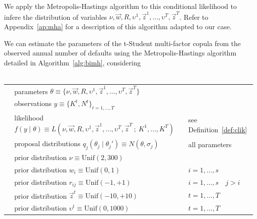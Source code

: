 \documentclass[11pt,fleqn]{book} %
\begin{document}
We apply the Metropolis-Hastings algorithm to this conditional likelihood  
to infere the distribution of variables $\nu,\vec{w},R, \upsilon^1,\vec{z}^1,
\dots,\upsilon^T,\vec{z}^T$. Refer to Appendix~\ref{ap:mha} for a description 
of this algorithm adapted to our case.

\begin{proposition}
	\label{prop:pemh}
	We can estimate the parameters of the t-Student multi-factor copula from 
	the observed annual number of defaults using the Metropolis-Hastings 
	algorithm detailed in Algorithm~\ref{alg:bimh}, considering
	~\\
	~\\
	\begin{listliketab} 
		\begin{tabular}{lll}
			\textbullet & parameters $\theta \equiv \{ \nu,\vec{w},R,\upsilon^1,\vec{z}^1,\dots,\upsilon^T,\vec{z}^T\}$ & \\
			\textbullet & observations $y \equiv \{K^t, N^t\}_{t=1,\dots,T}$ & \\
			\textbullet & likelihood $f(y \mid \theta) \equiv L(\nu,\vec{w},R,\upsilon^1,\vec{z}^1,\dots,\upsilon^T,\vec{z}^T\ ;\ K^1,\dots,K^T)$ & see Definition~\ref{def:clik} \\
			\textbullet & proposal distributions $q_j(\theta_j \mid \theta_j') \equiv N(\theta,\sigma_j)$ & all parameters\\
			\textbullet & prior distribution $\nu \equiv \text{Unif}(2,300)$ & \\
			\textbullet & prior distribution $w_i \equiv \text{Unif}(0,1)$ & $i=1,\dots,s$ \\
			\textbullet & prior distribution $r_{ij} \equiv \text{Unif}(-1,+1)$ & $i=1,\dots,s \quad j>i$ \\
			\textbullet & prior distribution $\vec{z}^t \equiv \text{Unif}(-10,+10)$ & $t=1,\dots,T$ \\
			\textbullet & prior distribution $\upsilon^t \equiv \text{Unif}(0,1000)$ & $t=1,\dots,T$ \\
		\end{tabular}
	\end{listliketab}
\end{proposition}
\end{document}
